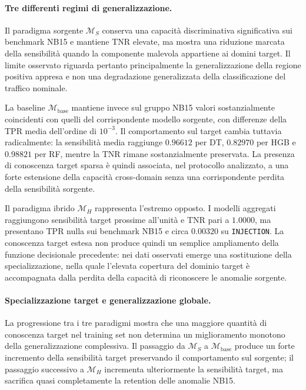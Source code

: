 \paragraph{Tre differenti regimi di generalizzazione.}
Il paradigma sorgente $\mathcal{M}_{S}$ conserva una capacità discriminativa significativa sui benchmark NB15 e mantiene TNR elevate, ma mostra una riduzione marcata della sensibilità quando la componente malevola appartiene ai domini target. 
Il limite osservato riguarda pertanto principalmente la generalizzazione della regione positiva appresa e non una degradazione generalizzata della classificazione del traffico nominale.

La baseline $\mathcal{M}_{\mathrm{base}}$ mantiene invece sul gruppo NB15 valori sostanzialmente coincidenti con quelli del corrispondente modello sorgente, con differenze della TPR media dell'ordine di $10^{-3}$. 
Il comportamento sul target cambia tuttavia radicalmente: la sensibilità media raggiunge $0.96612$ per DT, $0.82970$ per HGB e $0.98821$ per RF, mentre la TNR rimane sostanzialmente preservata. 
La presenza di conoscenza target sparsa è quindi associata, nel protocollo analizzato, a una forte estensione della capacità cross-domain senza una corrispondente perdita della sensibilità sorgente.

Il paradigma ibrido $\mathcal{M}_{H}$ rappresenta l'estremo opposto. 
I modelli aggregati raggiungono sensibilità target prossime all'unità e TNR pari a $1.0000$, ma presentano TPR nulla sui benchmark NB15 e circa $0.00320$ su \texttt{INJECTION}. 
La conoscenza target estesa non produce quindi un semplice ampliamento della funzione decisionale precedente: nei dati osservati emerge una sostituzione della specializzazione, nella quale l'elevata copertura del dominio target è accompagnata dalla perdita della capacità di riconoscere le anomalie sorgente.

\paragraph{Specializzazione target e generalizzazione globale.}
La progressione tra i tre paradigmi mostra che una maggiore quantità di conoscenza target nel training set non determina un miglioramento monotono della generalizzazione complessiva. 
Il passaggio da $\mathcal{M}_{S}$ a $\mathcal{M}_{\mathrm{base}}$ produce un forte incremento della sensibilità target preservando il comportamento sul sorgente; il passaggio successivo a $\mathcal{M}_{H}$ incrementa ulteriormente la sensibilità target, ma sacrifica quasi completamente la retention delle anomalie NB15.

